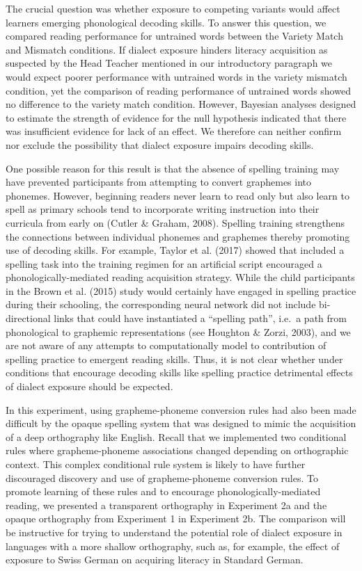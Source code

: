 \documentclass[doc,floatsintext]{apa6}
\begin{document}
The crucial question was whether exposure to competing variants would
affect learners emerging phonological decoding skills. To answer this
question, we compared reading performance for untrained words between
the Variety Match and Mismatch conditions. If dialect exposure hinders
literacy acquisition as suspected by the Head Teacher mentioned in our
introductory paragraph we would expect poorer performance with untrained
words in the variety mismatch condition, yet the comparison of reading
performance of untrained words showed no difference to the variety match
condition. However, Bayesian analyses designed to estimate the strength
of evidence for the null hypothesis indicated that there was
insufficient evidence for lack of an effect. We therefore can neither
confirm nor exclude the possibility that dialect exposure impairs
decoding skills.

One possible reason for this result is that the absence of spelling
training may have prevented participants from attempting to convert
graphemes into phonemes. However, beginning readers never learn to read
only but also learn to spell as primary schools tend to incorporate
writing instruction into their curricula from early on (Cutler \&
Graham, 2008). Spelling training strengthens the connections between
individual phonemes and graphemes thereby promoting use of decoding
skills. For example, Taylor et al. (2017) showed that included a
spelling task into the training regimen for an artificial script
encouraged a phonologically-mediated reading acquisition strategy. While
the child participants in the Brown et al. (2015) study would certainly
have engaged in spelling practice during their schooling, the
corresponding neural network did not include bi-directional links that
could have instantiated a \enquote{spelling path}, i.e.~a path from
phonological to graphemic representations (see Houghton \& Zorzi, 2003),
and we are not aware of any attempts to computationally model to
contribution of spelling practice to emergent reading skills. Thus, it
is not clear whether under conditions that encourage decoding skills
like spelling practice detrimental effects of dialect exposure should be
expected.

In this experiment, using grapheme-phoneme conversion rules had also
been made difficult by the opaque spelling system that was designed to
mimic the acquisition of a deep orthography like English. Recall that we
implemented two conditional rules where grapheme-phoneme associations
changed depending on orthographic context. This complex conditional rule
system is likely to have further discouraged discovery and use of
grapheme-phoneme conversion rules. To promote learning of these rules
and to encourage phonologically-mediated reading, we presented a
transparent orthography in Experiment 2a and the opaque orthography from
Experiment 1 in Experiment 2b. The comparison will be instructive for
trying to understand the potential role of dialect exposure in languages
with a more shallow orthography, such as, for example, the effect of
exposure to Swiss German on acquiring literacy in Standard German.
\end{document}

